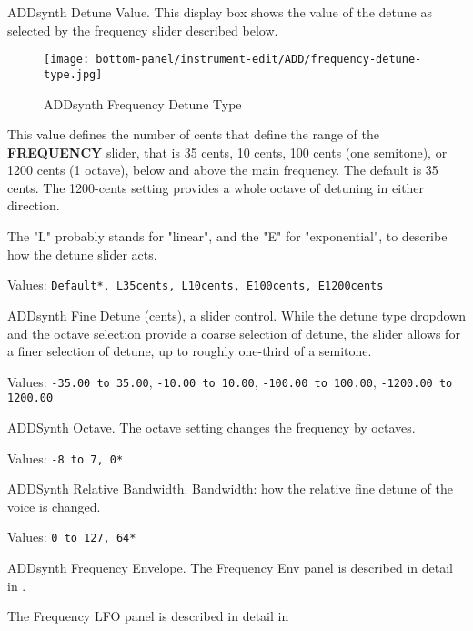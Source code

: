    \setcounter{ItemCounter}{0}      %

   ADDsynth Detune Value.
   This display box shows the value of the detune as selected by the
   frequency slider described below.

\begin{figure}[H]
   \centering
   \texttt{[image: bottom-panel/instrument-edit/ADD/frequency-detune-type.jpg]}
   \caption{ADDsynth Frequency Detune Type}
   \label{fig:addsynth_freq_detune_type}
\end{figure}

   This value defines the number of cents that define the range of the
   \textbf{FREQUENCY} slider, that is 35 cents, 10 cents, 100 cents (one
   semitone), or 1200 cents (1 octave), below and above the main
   frequency.  The default is 35 cents.  The 1200-cents setting provides a
   whole octave of detuning in either direction.

   The "L" probably stands for "linear", and the "E" for "exponential", to
   describe how the detune slider acts.

   Values: \texttt{Default*, L35cents, L10cents, E100cents, E1200cents}

   ADDsynth Fine Detune (cents), a slider control.
   While the detune type dropdown and the octave selection provide a coarse
   selection of detune, the slider allows for a finer selection of detune,
   up to roughly one-third of a semitone.

   Values:
      \texttt{-35.00 to 35.00},
      \texttt{-10.00 to 10.00},
      \texttt{-100.00 to 100.00},
      \texttt{-1200.00 to 1200.00}

   ADDSynth Octave.
   The octave setting changes the frequency by octaves.

   Values: \texttt{-8 to 7, 0*}

   ADDSynth Relative Bandwidth.
   Bandwidth: how the relative fine detune of the voice is changed.

   Values: \texttt{0 to 127, 64*}

   ADDsynth Frequency Envelope.
   The Frequency Env panel is described in detail in
   .

   The Frequency LFO panel is described in detail in

